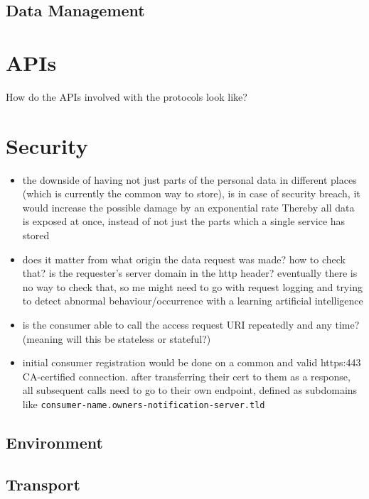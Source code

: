 \documentclass[12pt,english,a4paper,titlepage,cleardoublepage=empty,dottedtoc]{report}
\begin{document}
\subsection{Data Management}\label{data-management}

\section{APIs}\label{apis}

How do the APIs involved with the protocols look like?

\section{Security}\label{security}

\begin{itemize}
\item
  the downside of having not just parts of the personal data in
  different places (which is currently the common way to store), is in
  case of security breach, it would increase the possible damage by an
  exponential rate Thereby all data is exposed at once, instead of not
  just the parts which a single service has stored
\item
  does it matter from what origin the data request was made? how to
  check that? is the requester's server domain in the http header?
  eventually there is no way to check that, so me might need to go with
  request logging and trying to detect abnormal behaviour/occurrence
  with a learning artificial intelligence
\item
  is the consumer able to call the access request URI repeatedly and any
  time? (meaning will this be stateless or stateful?)
\item
  initial consumer registration would be done on a common and valid
  https:443 CA-certified connection. after transferring their cert to
  them as a response, all subsequent calls need to go to their own
  endpoint, defined as subdomains like
  \texttt{consumer-name.owners-notification-server.tld}
\end{itemize}

\subsection{Environment}\label{environment}

\subsection{Transport}\label{transport}
\end{document}
